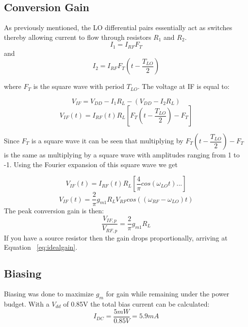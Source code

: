 \documentclass{article}                                                         %
\begin{document}
\subsection{Conversion Gain}
As previously mentioned, the LO differential pairs essentially act as switches thereby allowing current to flow through resistors $R_1$
and $R_2$.
\begin{equation}
  \label{eq:I1}
  I_1 = I_{RF}F_{T}
\end{equation}
and
\begin{equation}
  \label{eq:I2}
  I_2 = I_{RF}F_{T}(t-\dfrac{T_{LO}}{2})
\end{equation}

where $F_{T}$ is the square wave with period $T_{LO}$. The voltage at IF is equal to:

\begin{equation}
  \label{eq:VIF}
  V_{IF} = V_{DD} - I_1R_L - (V_{DD}-I_2R_L)
\end{equation}
\begin{equation}
  \label{eq:VIFt}
  V_{IF}(t) = I_{RF}(t) R_L [F_{T}(t-\dfrac{T_{LO}}{2})-F_{T}]
\end{equation}

\vspace{5mm}Since $F_T$ is a square wave it can be seen that multiplying by $F_{T}(t-\dfrac{T_{LO}}{2})-F_{T}$
is the same as multiplying by a square\vspace{3mm} wave with amplitudes ranging from 1 to -1. Using the Fourier
expansion of this square wave we get

\begin{equation}
  \label{eq:VIFt2}
  V_{IF}(t) = I_{RF}(t)R_L[\dfrac{4}{\pi}cos(\omega_{LO}t)...]
\end{equation}
\begin{equation}
  \label{eq:VIFt3}
  V_{IF}(t) = \dfrac{2}{\pi}g_{m1}R_LV_{RF}cos((\omega_{RF}-\omega_{LO})t)
\end{equation}
The peak conversion gain is then:
\begin{equation}
  \label{eq:Vgain}
  \dfrac{V_{IF,p}}{V_{RF,p}} = \dfrac{2}{\pi}g_{m1}R_L
\end{equation}
\vspace{3mm}If you have a source resistor then the gain drops proportionally, arriving at Equation ~\ref{eq:idealgain}.

\subsection{Biasing}
Biasing was done to maximize $g_m$ for gain while remaining under the power budget. With a $V_{dd}$ of 0.85V
the total bias current can be calculated:
\begin{equation}
  \label{eq:biascurrent}
  I_{DC} = \dfrac{5mW}{0.85V} = 5.9mA
\end{equation}
\end{document}
